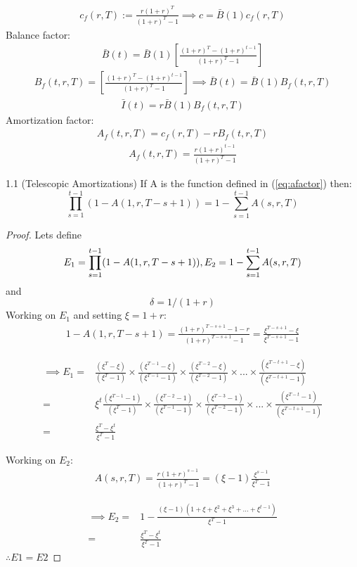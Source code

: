 \begin{align}
    \boxed{c_f(r,T):=\frac{r(1+r)^T}{(1+r)^T-1}} \implies c=\bar{B}(1)c_f(r,T)
\end{align}
Balance factor:
\begin{align}
    \bar{B}(t)=\bar{B}(1)\left[ \frac{(1+r)^T-(1+r)^{t-1}}{(1+r)^T-1} \right]
\end{align}
\begin{align}
    \boxed{B_f(t,r,T)=\left[ \frac{(1+r)^T-(1+r)^{t-1}}{(1+r)^T-1} \right]} \implies \bar{B}(t)=\bar{B}(1)B_f(t,r,T)
\end{align}
\begin{align}
    \bar{I}(t) = r\bar{B}(1)B_f(t,r,T)
\end{align}
Amortization factor:
\begin{align}
    A_f(t,r,T) = c_f(r,T)-rB_f(t,r,T)
\end{align}
\begin{align}
    \boxed{A_f(t,r,T)=\frac{r(1+r)^{t-1}}{(1+r)^T-1}} \label{eq:afactor}
\end{align}


\begin{theorem}{1.1 (Telescopic Amortizations)}{} \label{teo:1}
If A is the function defined in (\ref{eq:afactor}) then:
\[
\prod^{t-1}_{s=1}(1-A(1,r,T-s+1))=1-\sum^{t-1}_{s=1}A(s,r,T)
\]
\end{theorem}

\begin{proof}{}{} Lets define
\[
E_1=\prod^{t-1}_{s=1}(1-A(1,r,T-s+1)), \\
E_2 =1-\sum^{t-1}_{s=1}A(s,r,T)
\]
and
\[
\delta =1/(1+r)
\]
Working on $E_1$ and setting $\xi=1+r$:
\begin{align}
1-A(1,r,T-s+1) = \frac{(1+r)^{T-s+1}-1-r}{(1+r)^{T-s+1}-1}=\frac{\xi^{T-s+1}-\xi}{\xi^{T-s+1}-1} \nonumber
\end{align}

\begin{align}
\implies E_1 =& \frac{(\xi^T-\xi)}{(\xi^T-1)}\times \frac{(\xi^{T-1}-\xi)}{(\xi^{T-1}-1)} \times \frac{(\xi^{T-2}-\xi)}{(\xi^{T-2}-1)} \times ... \times \frac{(\xi^{T-t+1}-\xi)}{(\xi^{T-t+1}-1)} \nonumber\\
=&\xi^t \frac{(\xi^{T-1}-1)}{(\xi^T-1)}\times \frac{(\xi^{T-2}-1)}{(\xi^{T-1}-1)} \times \frac{(\xi^{T-3}-1)}{(\xi^{T-2}-1)} \times ... \times \frac{(\xi^{T-t}-1)}{(\xi^{T-t+1}-1)} \nonumber\\
=&\frac{\xi^T-\xi^t}{\xi^T-1} \label{eq:e1}
\end{align}

Working on $E_2$:
\begin{align}
A(s,r,T) = \frac{r(1+r)^{s-1}}{(1+r)^{T}-1}=(\xi-1)\frac{\xi^{s-1}}{\xi^{T}-1} \nonumber
\end{align}

\begin{align}
\implies E_2 =& 1-\frac{(\xi-1)(1+\xi+\xi^2+\xi^3+...+\xi^{t-1})}{\xi^T-1}\nonumber\\
=&\frac{\xi^T-\xi^t}{\xi^T-1} 
\end{align}
$\therefore E1=E2$
\end{proof}

